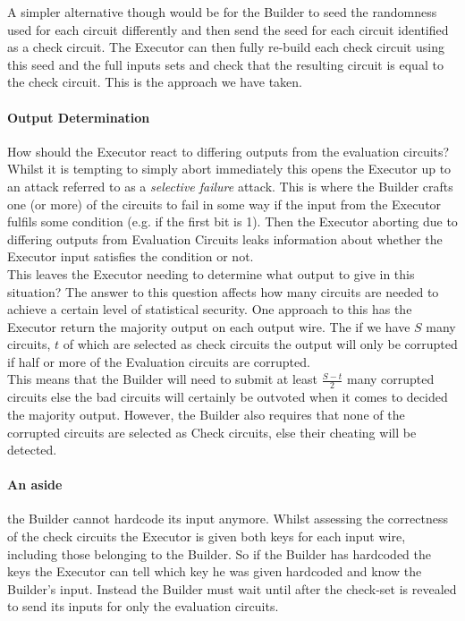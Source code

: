 \documentclass[ %
                    author={Nicholas Tutte},
                supervisor={Prof. Nigel Smart},
                    degree={MEng},
                     title={Secure Two Party Computation},
                  subtitle={A practical comparison of recent protocols},
                      type={Research - GG1K},
                      year={2015} ]{dissertation}
\begin{document}
				A simpler alternative though would be for the Builder to seed the randomness used for each circuit differently and then send the seed for each circuit identified as a check circuit. The Executor can then fully re-build each check circuit using this seed and the full inputs sets and check that the resulting circuit is equal to the check circuit. This is the approach we have taken.

				\paragraph{Output Determination} How should the Executor react to differing outputs from the evaluation circuits? Whilst it is tempting to simply abort immediately this opens the Executor up to an attack referred to as a \emph{selective failure} attack. This is where the Builder crafts one (or more) of the circuits to fail in some way if the input from the Executor fulfils some condition (e.g. if the first bit is 1). Then the Executor aborting due to differing outputs from Evaluation Circuits leaks information about whether the Executor input satisfies the condition or not.\\

				This leaves the Executor needing to determine what output to give in this situation? The answer to this question affects how many circuits are needed to achieve a certain level of statistical security. One approach to this has the Executor return the majority output on each output wire. The if we have $S$ many circuits, $t$ of which are selected as check circuits the output will only be corrupted if half or more of the Evaluation circuits are corrupted.\\

				This means that the Builder will need to submit at least $\frac{S - t}{2}$ many corrupted circuits else the bad circuits will certainly be outvoted when it comes to decided the majority output. However, the Builder also requires that none of the corrupted circuits are selected as Check circuits, else their cheating will be detected.

				\paragraph{An aside} the Builder cannot hardcode its input anymore. Whilst assessing the correctness of the check circuits the Executor is given both keys for each input wire, including those belonging to the Builder. So if the Builder has hardcoded the keys the Executor can tell which key he was given hardcoded and know the Builder's input. Instead the Builder must wait until after the check-set is revealed to send its inputs for only the evaluation circuits.
\end{document}
